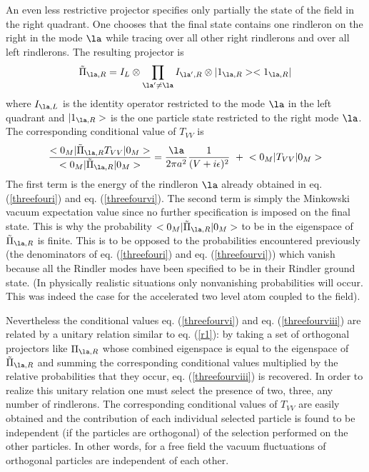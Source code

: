 An even less restrictive projector  specifies only partially
the state of the field in the right quadrant. One chooses
that the final state contains one rindleron on the right in the mode $\la$
while tracing over all other right rindlerons and over all left rindlerons.
The resulting projector is
\begin{equation} \tilde \Pi_{\la,R}  =
I_{L} \otimes \prod_{\la^\prime \neq \la}
I_{\la^\prime,R}\otimes \ket{1_{\la,R}}\bra{1_{\la,R}}  \label{threefourvii}
\end{equation}
where $I_{\la,L}$ is the identity operator restricted to the
mode $\la$ in the left quadrant and $\ket{1_{\la, R}}$ is
the one particle state restricted to the right mode $\la$.
The
corresponding conditional value of $T_{VV}$ is \begin{eqnarray} {
\expect{0_M}{\tilde \Pi_{\la,R} T_{VV}}{0_M} \over \expect{0_M}{\tilde
\Pi_{\la,R}}{0_M}} =
{\la \over 2 \pi
a^2}{1 \over (V + i \e)^2} \ + \  \expect{0_M}{T_{VV}}{0_M}
\label{threefourviii} \end{eqnarray}
The first term is the energy of the rindleron $\la$ already obtained
in eq. (\ref{threefouri}) and eq. (\ref{threefourvi}). The second term
is simply the Minkowski vacuum expectation value since no further
specification is imposed on the final state.
This is why the probability $\expect{0_M}{\tilde
\Pi_{\la,R}}{0_M}$ to be in the eigenspace of $\tilde
\Pi_{\la,R}$ is finite. This is to be opposed to the probabilities
encountered previously (the denominators of eq. (\ref{threefouri}) and
eq. (\ref{threefourvi})) which
vanish because all the Rindler modes have been
specified
to be in their Rindler ground state.
(In physically realistic situations  only
nonvanishing probabilities
will occur. This was indeed the case for the accelerated two level atom
coupled to the field).

 Nevertheless the conditional values eq.
(\ref{threefourvi}) and eq. (\ref{threefourviii}) are related by a
unitary relation similar to eq. (\ref{r1}): by taking a set
of orthogonal projectors like $\Pi_{\la,R}$ whose combined eigenspace
is equal to the eigenspace of
$\tilde \Pi_{\la,R}$
and summing
the corresponding
conditional values multiplied by the relative probabilities that they occur,
eq. (\ref{threefourviii}) is recovered. In order to realize this unitary
relation one must select
the presence of two, three, any number of rindlerons.
The corresponding
conditional values of $T_{VV}$ are easily obtained and the contribution of each
individual selected particle is found to be independent
(if the particles are orthogonal) of the selection performed
on the other particles. In other words, for a free field the vacuum
fluctuations of orthogonal particles are independent of each other.

